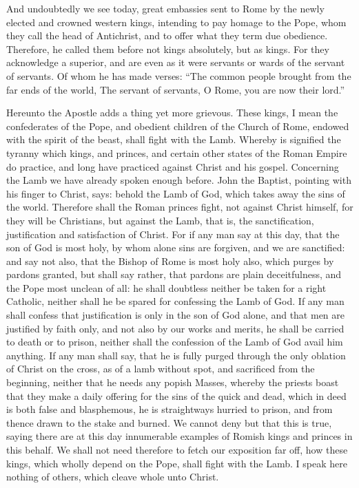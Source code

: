 And undoubtedly we see today, great embassies sent to Rome by the newly elected and crowned western kings, intending to pay homage to the Pope, whom they call the head of Antichrist, and to offer what they term due obedience. Therefore, he called them before not kings absolutely, but as kings. For they acknowledge a superior, and are even as it were servants or wards of the servant of servants. Of whom he has made verses: “The common people brought from the far ends of the world, The servant of servants, O Rome, you are now their lord.”

Hereunto the Apostle adds a thing yet more grievous. These kings, I mean the confederates of the Pope, and obedient children of the Church of Rome, endowed with the spirit of the beast, shall fight with the Lamb. Whereby is signified the tyranny which kings, and princes, and certain other states of the Roman Empire do practice, and long have practiced against Christ and his gospel. Concerning the Lamb we have already spoken enough before. John the Baptist, pointing with his finger to Christ, says: behold the Lamb of God, which takes away the sins of the world. Therefore shall the Roman princes fight, not against Christ himself, for they will be Christians, but against the Lamb, that is, the sanctification, justification and satisfaction of Christ. For if any man say at this day, that the son of God is most holy, by whom alone sins are forgiven, and we are sanctified: and say not also, that the Bishop of Rome is most holy also, which purges by pardons granted, but shall say rather, that pardons are plain deceitfulness, and the Pope most unclean of all: he shall doubtless neither be taken for a right Catholic, neither shall he be spared for confessing the Lamb of God. If any man shall confess that justification is only in the son of God alone, and that men are justified by faith only, and not also by our works and merits, he shall be carried to death or to prison, neither shall the confession of the Lamb of God avail him anything. If any man shall say, that he is fully purged through the only oblation of Christ on the cross, as of a lamb without spot, and sacrificed from the beginning, neither that he needs any popish Masses, whereby the priests boast that they make a daily offering for the sins of the quick and dead, which in deed is both false and blasphemous, he is straightways hurried to prison, and from thence drawn to the stake and burned. We cannot deny but that this is true, saying there are at this day innumerable examples of Romish kings and princes in this behalf. We shall not need therefore to fetch our exposition far off, how these kings, which wholly depend on the Pope, shall fight with the Lamb. I speak here nothing of others, which cleave whole unto Christ.


